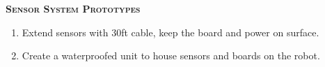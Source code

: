 \documentclass[final,t]{beamer}
\begin{document}
\begin{frame}{}
\begin{columns}
\begin{column}{.5\linewidth}
  					\begin{block}{\textsc{\textbf{Sensor System Prototypes}}}
                    \begin{enumerate}
    	                \item
                    	Extend sensors with 30ft cable, keep the board and power on surface.
						\item  Create a waterproofed unit to house sensors and boards on the robot.
					\end{enumerate}



\end{block}
\end{column}
\end{columns}
\end{frame}
\end{document}
